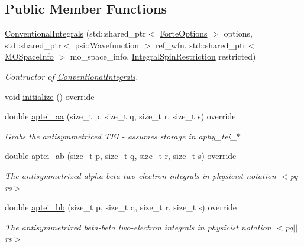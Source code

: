 \subsection*{Public Member Functions}
\begin{DoxyCompactItemize}
\item 
\mbox{\hyperlink{classforte_1_1_conventional_integrals_a4b49dff68c291079528e82420e037248}{Conventional\+Integrals}} (std\+::shared\+\_\+ptr$<$ \mbox{\hyperlink{classforte_1_1_forte_options}{Forte\+Options}} $>$ options, std\+::shared\+\_\+ptr$<$ psi\+::\+Wavefunction $>$ ref\+\_\+wfn, std\+::shared\+\_\+ptr$<$ \mbox{\hyperlink{classforte_1_1_m_o_space_info}{M\+O\+Space\+Info}} $>$ mo\+\_\+space\+\_\+info, \mbox{\hyperlink{namespaceforte_a7defa2660dd3eb07aa81176b90781be7}{Integral\+Spin\+Restriction}} restricted)
\begin{DoxyCompactList}\small\item\em Contructor of \mbox{\hyperlink{classforte_1_1_conventional_integrals}{Conventional\+Integrals}}. \end{DoxyCompactList}\item 
void \mbox{\hyperlink{classforte_1_1_conventional_integrals_a9d9d6528eb1241a9e03fcf82e4a88dbe}{initialize}} () override
\item 
double \mbox{\hyperlink{classforte_1_1_conventional_integrals_a4df626960614077f1df435efba44bd0a}{aptei\+\_\+aa}} (size\+\_\+t p, size\+\_\+t q, size\+\_\+t r, size\+\_\+t s) override
\begin{DoxyCompactList}\small\item\em Grabs the antisymmetriced T\+EI -\/ assumes storage in aphy\+\_\+tei\+\_\+$\ast$. \end{DoxyCompactList}\item 
double \mbox{\hyperlink{classforte_1_1_conventional_integrals_a7ebb8bcee10a6cbac613e7b626093731}{aptei\+\_\+ab}} (size\+\_\+t p, size\+\_\+t q, size\+\_\+t r, size\+\_\+t s) override
\begin{DoxyCompactList}\small\item\em The antisymmetrixed alpha-\/beta two-\/electron integrals in physicist notation $<$pq$\vert$rs$>$ \end{DoxyCompactList}\item 
double \mbox{\hyperlink{classforte_1_1_conventional_integrals_ae6d6bfe97bb42d74dc9b69b5c617a966}{aptei\+\_\+bb}} (size\+\_\+t p, size\+\_\+t q, size\+\_\+t r, size\+\_\+t s) override
\begin{DoxyCompactList}\small\item\em The antisymmetrixed beta-\/beta two-\/electron integrals in physicist notation $<$pq$\vert$$\vert$rs$>$ \end{DoxyCompactList}\item 

\end{DoxyCompactItemize}
